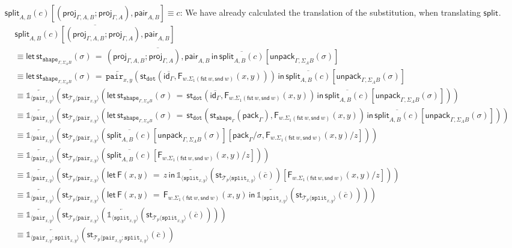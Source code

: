 \documentclass[10pt]{article}
\theoremstyle{definition}
\newcommand\dsd[1]{\ensuremath{\mathsf{#1}}}
\newcommand{\app}[2]{\ensuremath{#1 \: #2}}
\newcommand{\fst}[1]{\app{\dsd{fst}}{#1}}
\newcommand{\snd}[1]{\app{\dsd{snd}}{#1}}
\newcommand{\id}{\mathsf{id}}
\newcommand{\rewrite}[2]{\overleftarrow{#1}(#2)}
\newcommand\StI[2]{\ensuremath{\mathsf{st}_{#1}(#2)}}
\newcommand\StE[4]{\ensuremath{\mathsf{let} \, \StI{#1}{#3} \, = \, {#2} \, \mathsf{in} \, #4}}
\newcommand\FE[3]{\ensuremath{\mathsf{let} \, \mathsf{F}(#2) \, = \, {#1} \, \mathsf{in} \, #3}}
\newcommand\FIs[2]{\ensuremath{\mathsf{F}_{#1}{(#2)}}}
\newcommand\ApEl[2]{\mathcal{T}_{#1}\langle#2\rangle}
\newcommand\pack[1]{\ensuremath{\mathsf{pack}_{#1}}}
\newcommand\unpack[2]{\ensuremath{\mathsf{unpack}_{#1}(#2)}}
\newcommand{\tdot}{\ensuremath{\mathtt{dot}}}
\newcommand{\tshape}[1]{\ensuremath{\mathtt{shape}_{#1}}}
\newcommand{\upstairs}[1]{\overline{#1}}
\newcommand\proj[1]{\ensuremath{\mathsf{proj}_{#1}}}
\newcommand\One{\ensuremath{\mathds{1}}}
\newcommand\ApOne[1]{\ensuremath{\One_{\langle {#1} \rangle }}}
\newcommand\pair[1]{\ensuremath{\mathtt{pair}_{#1}}}
\newcommand\tsplit[1]{\ensuremath{\mathtt{split}_{#1}}}
\newcommand\qpair[1]{\ensuremath{\mathsf{pair}_{#1}}}
\newcommand\qsplit[1]{\ensuremath{\mathsf{split}_{#1}}}
\begin{document}
\begin{enumerate}[style = multiline, labelwidth = 80pt]
\item[{$\qsplit{A,B}(c)\allowbreak[(\proj{\Gamma, A, B};\proj{\Gamma, A}), \allowbreak\qpair{A,B}] \equiv c$}:] 
We have already calculated the translation of the substitution, when translating $\qsplit{}$.
\begin{align*}
&\upstairs{\qsplit{A,B}(c)[(\proj{\Gamma, A, B};\proj{\Gamma, A}), \qpair{A,B}]} \\
&\equiv \StE{\tshape{\Gamma, \Sigma_A B}}{\upstairs{(\proj{\Gamma, A, B};\proj{\Gamma, A}), \qpair{A,B}}}{\sigma}{\upstairs{\qsplit{A,B}(c)}[\unpack{\Gamma, \Sigma_A B}{\sigma}]} \\
&\equiv \StE{\tshape{\Gamma, \Sigma_A B}}{\rewrite{\pair{x,y}}{\StI{\tdot}{\upstairs{\id_\Gamma},\FIs{w. \Sigma_1(\fst w, \snd w)}{x,y}}}}{\sigma}{\upstairs{\qsplit{A,B}(c)}[\unpack{\Gamma, \Sigma_A B}{\sigma}]} \\
&\equiv \rewrite{\ApOne{\pair{x,y}}}{\StI{\ApEl{p}{\pair{x,y}}}{\StE{\tshape{\Gamma, \Sigma_A B}}{\StI{\tdot}{\upstairs{\id_\Gamma},\FIs{w. \Sigma_1(\fst w, \snd w)}{x,y}}}{\sigma}{\upstairs{\qsplit{A,B}(c)}[\unpack{\Gamma, \Sigma_A B}{\sigma}]}}} \\
&\equiv \rewrite{\ApOne{\pair{x,y}}}{\StI{\ApEl{p}{\pair{x,y}}}{\StE{\tshape{\Gamma, \Sigma_A B}}{\StI{\tdot}{\StI{\tshape{\Gamma}}{\pack{\Gamma}},\FIs{w. \Sigma_1(\fst w, \snd w)}{x,y}}}{\sigma}{\upstairs{\qsplit{A,B}(c)}[\unpack{\Gamma, \Sigma_A B}{\sigma}]}}} \\
&\equiv \rewrite{\ApOne{\pair{x,y}}}{\StI{\ApEl{p}{\pair{x,y}}}{\upstairs{\qsplit{A,B}(c)}[\unpack{\Gamma, \Sigma_A B}{\sigma}][\pack{\Gamma}/\sigma, \FIs{w. \Sigma_1(\fst w, \snd w)}{x,y}/z]}} \\
&\equiv \rewrite{\ApOne{\pair{x,y}}}{\StI{\ApEl{p}{\pair{x,y}}}{\upstairs{\qsplit{A,B}(c)}[\FIs{w. \Sigma_1(\fst w, \snd w)}{x,y}/z]}} \\
&\equiv \rewrite{\ApOne{\pair{x,y}}}{\StI{\ApEl{p}{\pair{x,y}}}{\FE{z}{x,y}{\rewrite{\ApOne{\tsplit{x,y}}}{\StI{\ApEl{p}{\tsplit{x,y}}}{\upstairs{c}}}}[\FIs{w. \Sigma_1(\fst w, \snd w)}{x,y}/z]}} \\
&\equiv \rewrite{\ApOne{\pair{x,y}}}{\StI{\ApEl{p}{\pair{x,y}}}{\FE{\FIs{w. \Sigma_1(\fst w, \snd w)}{x,y}}{x,y}{\rewrite{\ApOne{\tsplit{x,y}}}{\StI{\ApEl{p}{\tsplit{x,y}}}{\upstairs{c}}}}}} \\
&\equiv \rewrite{\ApOne{\pair{x,y}}}{\StI{\ApEl{p}{\pair{x,y}}}{\rewrite{\ApOne{\tsplit{x,y}}}{\StI{\ApEl{p}{\tsplit{x,y}}}{\upstairs{c}}}}} \\
&\equiv \rewrite{\ApOne{\pair{x,y};\tsplit{x,y}}}{\StI{\ApEl{p}{\pair{x,y};\tsplit{x,y}}}{\upstairs{c}}} \\

\end{align*}
\end{enumerate}
\end{document}
